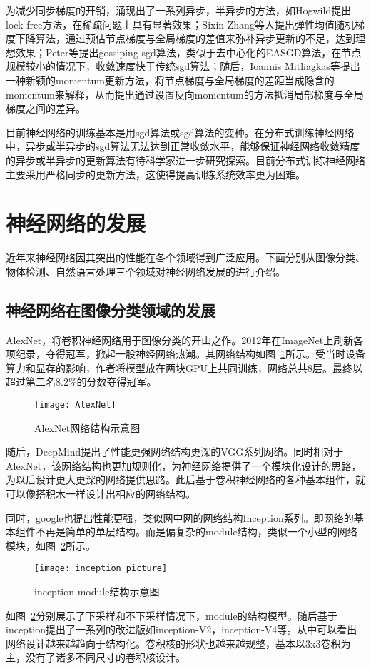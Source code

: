 为减少同步梯度的开销，涌现出了一系列异步，半异步的方法，如Hogwild提出lock free方法，在稀疏问题上具有显著效果；Sixin Zhang等人提出弹性均值随机梯度下降算法，通过预估节点梯度与全局梯度的差值来弥补异步更新的不足，达到理想效果；Peter等提出gossiping sgd算法，类似于去中心化的EASGD算法，在节点规模较小的情况下，收敛速度快于传统sgd算法；随后，Ioannis Mitliagkas等提出一种新颖的momentum更新方法，将节点梯度与全局梯度的差距当成隐含的momentum来解释，从而提出通过设置反向momentum的方法抵消局部梯度与全局梯度之间的差异。

目前神经网络的训练基本是用sgd算法或sgd算法的变种。在分布式训练神经网络中，异步或半异步的sgd算法无法达到正常收敛水平，能够保证神经网络收敛精度的异步或半异步的更新算法有待科学家进一步研究探索。目前分布式训练神经网络主要采用严格同步的更新方法，这使得提高训练系统效率更为困难。
\section{神经网络的发展}
近年来神经网络因其突出的性能在各个领域得到广泛应用。下面分别从图像分类、物体检测、自然语言处理三个领域对神经网络发展的进行介绍。
\subsection{神经网络在图像分类领域的发展}
AlexNet，将卷积神经网络用于图像分类的开山之作。2012年在ImageNet上刷新各项纪录，夺得冠军，掀起一股神经网络热潮。其网络结构如图~\ref{fig:AlexNet}所示。受当时设备算力和显存的影响，作者将模型放在两块GPU上共同训练，网络总共8层。最终以超过第二名8.2\%的分数夺得冠军。

\begin{figure}[htp]
\centering
\texttt{[image: AlexNet]}
\caption{AlexNet网络结构示意图}
\label{fig:AlexNet}
\end{figure}
随后，DeepMind提出了性能更强网络结构更深的VGG系列网络。同时相对于AlexNet，该网络结构也更加规则化，为神经网络提供了一个模块化设计的思路，为以后设计更大更深的网络提供思路。此后基于卷积神经网络的各种基本组件，就可以像搭积木一样设计出相应的网络结构。

同时，google也提出性能更强，类似网中网的网络结构Inception系列。即网络的基本组件不再是简单的单层结构。而是偏复杂的module结构，类似一个小型的网络模块，如图~\ref{fig:inception_picture}所示。

\begin{figure}[htp]
\centering
\texttt{[image: inception\_picture]}
\caption{inception module结构示意图}
\label{fig:inception_picture}
\end{figure}
如图~\ref{fig:inception_picture}分别展示了下采样和不下采样情况下，module的结构模型。随后基于inception提出了一系列的改进版如inception-V2，inception-V4等。从中可以看出网络设计越来越趋向于结构化。卷积核的形状也越来越规整，基本以3x3卷积为主，没有了诸多不同尺寸的卷积核设计。

